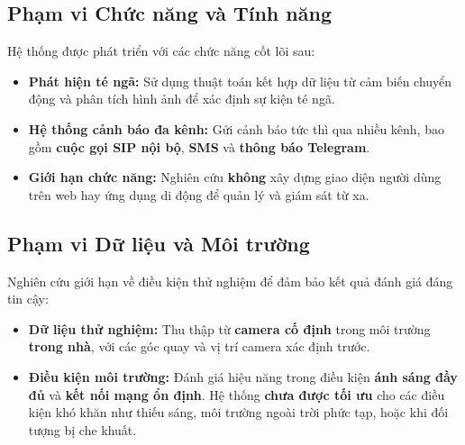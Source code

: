 \subsection{Phạm vi Chức năng và Tính năng}
Hệ thống được phát triển với các chức năng cốt lõi sau:
\begin{itemize}
    \item \textbf{Phát hiện té ngã:} Sử dụng thuật toán kết hợp dữ liệu từ cảm biến chuyển động và phân tích hình ảnh để xác định sự kiện té ngã.
    
    \item \textbf{Hệ thống cảnh báo đa kênh:} Gửi cảnh báo tức thì qua nhiều kênh, bao gồm \textbf{cuộc gọi SIP nội bộ}, \textbf{SMS} và \textbf{thông báo Telegram}.
    
    \item \textbf{Giới hạn chức năng:} Nghiên cứu \textbf{không} xây dựng giao diện người dùng trên web hay ứng dụng di động để quản lý và giám sát từ xa.
\end{itemize}

\subsection{Phạm vi Dữ liệu và Môi trường}
Nghiên cứu giới hạn về điều kiện thử nghiệm để đảm bảo kết quả đánh giá đáng tin cậy:
\begin{itemize}
    \item \textbf{Dữ liệu thử nghiệm:} Thu thập từ \textbf{camera cố định} trong môi trường \textbf{trong nhà}, với các góc quay và vị trí camera xác định trước.
    
    \item \textbf{Điều kiện môi trường:} Đánh giá hiệu năng trong điều kiện \textbf{ánh sáng đầy đủ} và \textbf{kết nối mạng ổn định}. Hệ thống \textbf{chưa được tối ưu} cho các điều kiện khó khăn như thiếu sáng, môi trường ngoài trời phức tạp, hoặc khi đối tượng bị che khuất.
\end{itemize}
